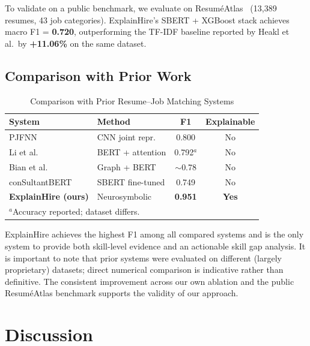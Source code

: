 \documentclass[conference]{IEEEtran}
\begin{document}
To validate on a public benchmark, we evaluate on ResuméAtlas~\cite{heakl2024resumeatlas}
(13,389 resumes, 43 job categories). ExplainHire's SBERT + XGBoost stack
achieves macro F1 = \textbf{0.720}, outperforming the TF-IDF baseline
reported by Heakl et al.\ by \textbf{+11.06\%} on the same dataset.

\subsection{Comparison with Prior Work}

\begin{table}[htbp]
\caption{Comparison with Prior Resume--Job Matching Systems}
\label{tab:comparison}
\centering
\begin{tabular}{llcc}
\toprule
\textbf{System} & \textbf{Method} & \textbf{F1} & \textbf{Explainable} \\
\midrule
PJFNN~\cite{zhu2018personjobfit}             & CNN joint repr.  & 0.800       & No  \\
Li et al.~\cite{li2020competence}            & BERT + attention & 0.792$^{a}$ & No  \\
Bian et al.~\cite{bian2020multiview}         & Graph + BERT     & $\sim$0.78  & No  \\
conSultantBERT~\cite{lavi2021consultantbert} & SBERT fine-tuned & 0.749       & No  \\
\textbf{ExplainHire (ours)}                  & Neurosymbolic    & \textbf{0.951} & \textbf{Yes} \\
\bottomrule
\multicolumn{4}{l}{\footnotesize $^{a}$Accuracy reported; dataset differs.}
\end{tabular}
\end{table}

ExplainHire achieves the highest F1 among all compared systems and is the
only system to provide both skill-level evidence and an actionable skill gap
analysis. It is important to note that prior systems were evaluated on
different (largely proprietary) datasets; direct numerical comparison is
indicative rather than definitive. The consistent improvement across our own
ablation and the public ResuméAtlas benchmark supports the validity of our
approach.

\section{Discussion}
\end{document}
